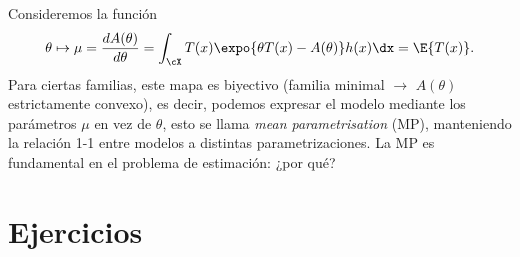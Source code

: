 \begin{remark}
Consideremos la función
\begin{equation}
    \theta \mapsto \mu = \frac{dA(\theta)}{d\theta} = \int_\cX T (x) \expo{\theta T (x) -A(\theta)}h(x)\dx =\E{T(x)}.
\end{equation}
Para ciertas familias, este mapa es biyectivo (familia minimal $\rightarrow$ $A(\theta)$ estrictamente convexo), es decir, podemos expresar el modelo mediante los parámetros $\mu$ en vez de $\theta$, esto se llama \emph{mean parametrisation} (MP), manteniendo la relación 1-1 entre modelos a distintas parametrizaciones. La MP es fundamental en el problema de estimación: ¿por qué?

\end{remark}

\section{Ejercicios}

